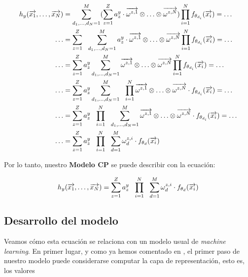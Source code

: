 \begin{equation}
\begin{split}
    h_y(\overrightarrow{x_1}, \ldots, \overrightarrow{x_N}) &= \sum_{d_1, \ldots, d_N = 1}^{M} (\sum_{z = 1}^Z a_z^y \cdot \overrightarrow{\omega^{z, 1}} \otimes \ldots \otimes \overrightarrow{\omega^{z, N}}) \prod_{i = 1}^N f_{\theta_{d_i}}(\overrightarrow{x_i}) = \ldots \\
    \ldots &=  \sum_{z = 1}^Z \ \  \sum_{d_1, \ldots, d_N = 1}^{M} a_z^y \cdot \overrightarrow{\omega^{z, 1}} \otimes \ldots \otimes \overrightarrow{\omega^{z, N}} \prod_{i = 1}^N f_{\theta_{d_i}}(\overrightarrow{x_i}) = \ldots \\
    \ldots &=  \sum_{z = 1}^Z a_z^y \sum_{d_1, \ldots, d_N = 1}^{M} \overrightarrow{\omega^{z, 1}} \otimes \ldots \otimes \overrightarrow{\omega^{z, N}} \prod_{i = 1}^N f_{\theta_{d_i}}(\overrightarrow{x_i}) = \ldots \\
    \ldots &=  \sum_{z = 1}^Z a_z^y \sum_{d_1, \ldots, d_N = 1}^{M} \ \  \prod_{i = 1}^N \overrightarrow{\omega^{z, 1}} \otimes \ldots \otimes \overrightarrow{\omega^{z, N}} \cdot f_{\theta_{d_i}}(\overrightarrow{x_i}) = \ldots \\
    \ldots &=  \sum_{z = 1}^Z a_z^y \ \  \prod_{i = 1}^N \ \  \sum_{d_1, \ldots, d_N = 1}^{M}  \overrightarrow{\omega^{z, 1}} \otimes \ldots \otimes \overrightarrow{\omega^{z, N}} \cdot f_{\theta_{d_i}}(\overrightarrow{x_i}) = \ldots \\
    \ldots &=  \sum_{z = 1}^Z a_z^y \ \  \prod_{i = 1}^N \ \  \sum_{d = 1}^{M} \omega^{z, i}_d \cdot f_{\theta_{d}}(\overrightarrow{x_i})
\end{split}
\end{equation}

Por lo tanto, nuestro \textbf{Modelo CP} se puede describir con la ecuación:

\begin{equation} \label{eq:cp_model}
    h_y(\overrightarrow{x_1}, \ldots, \overrightarrow{x_N}) =  \sum_{z = 1}^Z a_z^y \ \  \prod_{i = 1}^N \ \  \sum_{d = 1}^{M} \omega^{z, i}_d \cdot f_{\theta_{d}}(\overrightarrow{x_i})
\end{equation}

\subsection{Desarrollo del modelo}

Veamos cómo esta ecuación se relaciona con un modelo usual de \textit{machine learning}. En primer lugar, y como ya hemos comentado en , el primer paso de nuestro modelo puede considerarse computar la capa de representación, esto es, los valores

